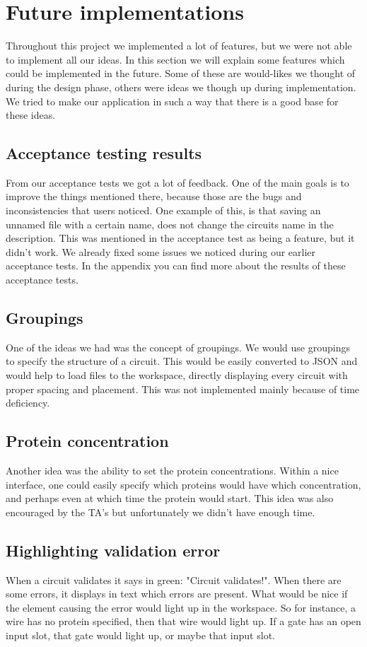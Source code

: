 \section{Future implementations}
Throughout this project we implemented a lot of features, but we were not able to implement all our ideas. In this section we will explain some features which could be implemented in the future. Some of these are would-likes we thought of during the design phase, others were ideas we though up during implementation. We tried to make our application in such a way that there is a good base for these ideas.

\subsection{Acceptance testing results}
From our acceptance tests we got a lot of feedback. One of the main goals is to improve the things mentioned there, because those are the bugs and inconsistencies that users noticed. One example of this, is that saving an unnamed file with a certain name, does not change the circuits name in the description. This was mentioned in the acceptance test as being a feature, but it didn't work. We already fixed some issues we noticed during our earlier acceptance tests. In the appendix you can find more about the results of these acceptance tests.

\subsection{Groupings}
One of the ideas we had was the concept of groupings. We would use groupings to specify the structure of a circuit. This would be easily converted to JSON and would help to load files to the workspace, directly displaying every circuit with proper spacing and placement. This was not implemented mainly because of time deficiency.

\subsection{Protein concentration}
Another idea was the ability to set the protein concentrations. Within a nice interface, one could easily specify which proteins would have which concentration, and perhaps even at which time the protein would start. This idea was also encouraged by the TA's but unfortunately we didn't have enough time.

\subsection{Highlighting validation error}
When a circuit validates it says in green: "Circuit validates!". When there are some errors, it displays in text which errors are present. What would be nice if the element causing the error would light up in the workspace. So for instance, a wire has no protein specified, then that wire would light up.
If a gate has an open input slot, that gate would light up, or maybe that input slot.

